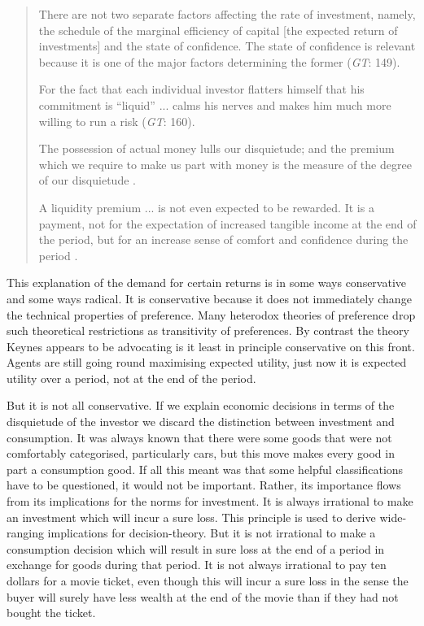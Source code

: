 \begin{quote}
\begin{sloppy}
There are not two separate factors affecting the rate of investment, namely, the schedule of the marginal efficiency of capital [the expected return of investments] and the state of confidence. The state of confidence is relevant because it is one of the major factors determining the former (\textit{GT}: 149).

For the fact that each individual investor flatters himself that his commitment is ``liquid'' ... calms his nerves and makes him much more willing to run a risk (\textit{GT}: 160).

The possession of actual money lulls our disquietude; and the premium which we require to make us part with money is the measure of the degree of our disquietude \cite[116]{Keynes1937}.

A liquidity premium ... is not even expected to be rewarded. It is a payment, not for the expectation of increased tangible income at the end of the period, but for an increase sense of comfort and confidence during the period \cite[293-294]{Keynes1938}.
\end{sloppy}
\end{quote}

\noindent This explanation of the demand for certain returns is in some ways conservative and some ways radical. It is conservative because it does not immediately change the technical properties of preference. Many heterodox theories of preference drop such theoretical restrictions as transitivity of preferences. By contrast the theory Keynes appears to be advocating is it least in principle conservative on this front. Agents are still going round maximising expected utility, just now it is expected utility over a period, not at the end of the period.

But it is not all conservative. If we explain economic decisions in terms of the disquietude of the investor we discard the distinction between investment and consumption. It was always known that there were some goods that were not comfortably categorised, particularly cars, but this move makes every good in part a consumption good. If all this meant was that some helpful classifications have to be questioned, it would not be important. Rather, its importance flows from its implications for the norms for investment. It is always irrational to make an investment which will incur a sure loss. This principle is used to derive wide-ranging implications for decision-theory. But it is not irrational to make a consumption decision which will result in sure loss at the end of a period in exchange for goods during that period. It is not always irrational to pay ten dollars for a movie ticket, even though this will incur a sure loss in the sense the buyer will surely have less wealth at the end of the movie than if they had not bought the ticket.

